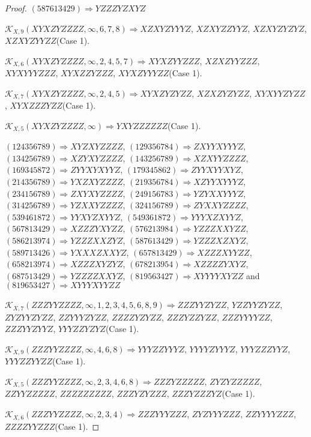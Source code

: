 \documentclass[12pt]{article}
\theoremstyle{plain}
\theoremstyle{definition}
\theoremstyle{remark}
\newcommand{\fancy}[1]{\mathcal{#1}}
\def\K{\fancy{K}}
\begin{document}
\begin{proof}
	
	
	$(5 8 7 6 1 3 4 2 9)\Rightarrow YZZZYZXYZ$
	
	
	$\K_{X,9}(XYXZYZZZZ,\infty,6, 7, 8)\Rightarrow $$XZXYZYYYZ$, $XZXYZZYYZ$, $XZXYZYZYZ$, $XZXYZYYZZ$(Case 1).
	
	$\K_{X,6}(XYXZYZZZZ,\infty,2, 4, 5, 7)\Rightarrow $$XYXZYYZZZ$, $XZXZYYZZZ$, $XYXYYYZZZ$, $XYXZZYZZZ$, $XYXZYYYZZ$(Case 1).
	
	$\K_{X,7}(XYXZYZZZZ,\infty,2, 4, 5)\Rightarrow $$XYXZYZYZZ$, $XZXZYZYZZ$, $XYXYYZYZZ$, $XYXZZZYZZ$(Case 1).
	
	$\K_{X,5}(XYXZYZZZZ,\infty)\Rightarrow $$YXYZZZZZZ$(Case 1).
	
	
	
	$(1 2 4 3 5 6 7 8 9)\Rightarrow XYZXYZZZZ$, $(1 2 9 3 5 6 7 8 4)\Rightarrow ZXYYXYYYZ$, $(1 3 4 2 5 6 7 8 9)\Rightarrow XZYXYZZZZ$, $(1 4 3 2 5 6 7 8 9)\Rightarrow XZXYYZZZZ$, $(1 6 9 3 4 5 8 7 2)\Rightarrow ZYYXYXYYZ$, $(1 7 9 3 4 5 8 6 2)\Rightarrow ZYYXYYXYZ$, $(2 1 4 3 5 6 7 8 9)\Rightarrow YXZXYZZZZ$, $(2 1 9 3 5 6 7 8 4)\Rightarrow XZYYXYYYZ$, $(2 3 4 1 5 6 7 8 9)\Rightarrow ZXYXYZZZZ$, $(2 4 9 1 5 6 7 8 3)\Rightarrow YZYXXYYYZ$, $(3 1 4 2 5 6 7 8 9)\Rightarrow YZXXYZZZZ$, $(3 2 4 1 5 6 7 8 9)\Rightarrow ZYXXYZZZZ$, $(5 3 9 4 6 1 8 7 2)\Rightarrow YYXYZXYYZ$, $(5 4 9 3 6 1 8 7 2)\Rightarrow YYYXZXYYZ$, $(5 6 7 8 1 3 4 2 9)\Rightarrow XZZZYXYZZ$, $(5 7 6 2 1 3 9 8 4)\Rightarrow YZZZXXYZZ$, $(5 8 6 2 1 3 9 7 4)\Rightarrow YZZZXXZYZ$, $(5 8 7 6 1 3 4 2 9)\Rightarrow YZZZXZXYZ$, $(5 8 9 7 1 3 4 2 6)\Rightarrow YXXXZXXYZ$, $(6 5 7 8 1 3 4 2 9)\Rightarrow XZZZXYYZZ$, $(6 5 8 2 1 3 9 7 4)\Rightarrow XZZZXYZYZ$, $(6 7 8 2 1 3 9 5 4)\Rightarrow XZZZZYXYZ$, $(6 8 7 5 1 3 4 2 9)\Rightarrow YZZZZXXYZ$, $(8 1 9 5 6 3 4 2 7)\Rightarrow XYYYYXYZZ$ and $(8 1 9 6 5 3 4 2 7)\Rightarrow XYYYXYYZZ$
	
	
	$\K_{X,7}(ZZZYYZZZZ,\infty,1, 2, 3, 4, 5, 6, 8, 9)\Rightarrow $$ZZZYYZYZZ$, $YZZYYZYZZ$, $ZYZYYZYZZ$, $ZZYYYZYZZ$, $ZZZZYZYZZ$, $ZZZYZZYZZ$, $ZZZYYYYZZ$, $ZZZYYZYYZ$, $YYYZZYZYZ$(Case 1).
	
	$\K_{X,9}(ZZZYYZZZZ,\infty,4, 6, 8)\Rightarrow $$YYYZZYYYZ$, $YYYYZYYYZ$, $YYYZZZYYZ$, $YYYZZYYZZ$(Case 1).
	
	$\K_{X,5}(ZZZYYZZZZ,\infty,2, 3, 4, 6, 8)\Rightarrow $$ZZZYZZZZZ$, $ZYZYZZZZZ$, $ZZYYZZZZZ$, $ZZZZZZZZZ$, $ZZZYZYZZZ$, $ZZZYZZZYZ$(Case 1).
	
	$\K_{X,6}(ZZZYYZZZZ,\infty,2, 3, 4)\Rightarrow $$ZZZYYYZZZ$, $ZYZYYYZZZ$, $ZZYYYYZZZ$, $ZZZZYYZZZ$(Case 1).
	

\end{proof}
\end{document}
